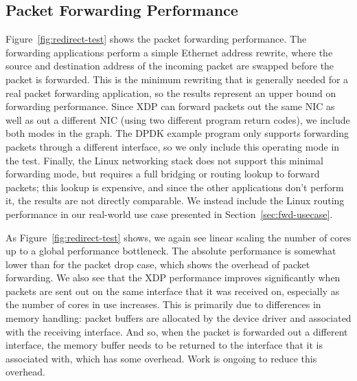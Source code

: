 \documentclass[10pt,sigconf]{acmart}
\begin{document}
\subsection{Packet Forwarding Performance}
\label{sec:pack-forw-perf}
Figure~\ref{fig:redirect-test} shows the packet forwarding performance. The
forwarding applications perform a simple Ethernet address rewrite, where the
source and destination address of the incoming packet are swapped before the
packet is forwarded. This is the minimum rewriting that is generally needed for
a real packet forwarding application, so the results represent an upper bound on
forwarding performance. Since XDP can forward packets out the same NIC as well
as out a different NIC (using two different program return codes), we include
both modes in the graph. The DPDK example program only supports forwarding
packets through a different interface, so we only include this operating mode in
the test. Finally, the Linux networking stack does not support this minimal
forwarding mode, but requires a full bridging or routing lookup to forward
packets; this lookup is expensive, and since the other applications don't
perform it, the results are not directly comparable. We instead include the
Linux routing performance in our real-world use case presented in
Section~\ref{sec:fwd-usecase}.

As Figure~\ref{fig:redirect-test} shows, we again see linear scaling the number
of cores up to a global performance bottleneck. The absolute performance is
somewhat lower than for the packet drop case, which shows the overhead of packet
forwarding. We also see that the XDP performance improves significantly when
packets are sent out on the same interface that it was received on, especially
as the number of cores in use increases. This is primarily due to differences in
memory handling: packet buffers are allocated by the device driver and
associated with the receiving interface. And so, when the packet is forwarded
out a different interface, the memory buffer needs to be returned to the
interface that it is associated with, which has some overhead. Work is ongoing
to reduce this overhead.
\end{document}
